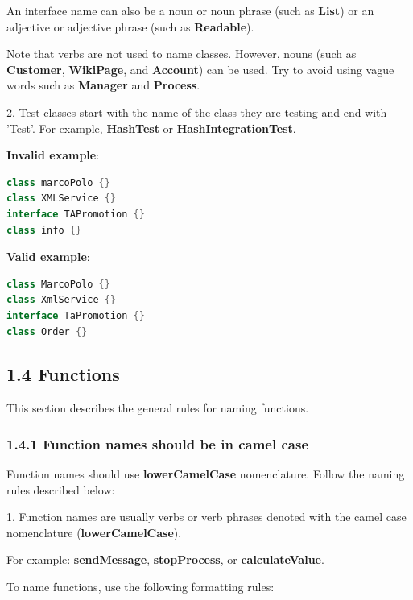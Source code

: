 {{{{{{{{An interface name can also be a noun or noun phrase (such as \textbf{List}) or an adjective or adjective phrase (such as \textbf{Readable}).

Note that verbs are not used to name classes. However, nouns (such as \textbf{Customer}, \textbf{WikiPage}, and \textbf{Account}) can be used. Try to avoid using vague words such as \textbf{Manager} and \textbf{Process}.



2.	Test classes start with the name of the class they are testing and end with 'Test'. For example, \textbf{HashTest} or \textbf{HashIntegrationTest}.



\textbf{Invalid example}: 

\begin{lstlisting}[language=Kotlin]
class marcoPolo {} 
class XMLService {} 
interface TAPromotion {}
class info {}
\end{lstlisting}


\textbf{Valid example}: 

\begin{lstlisting}[language=Kotlin]
class MarcoPolo {}
class XmlService {}
interface TaPromotion {}
class Order {}
\end{lstlisting}


\subsection*{\textbf{1.4 Functions}}

\label{sec:1.4}

This section describes the general rules for naming functions.

\subsubsection*{\textbf{1.4.1 Function names should be in camel case}}
\leavevmode\newline

\label{sec:1.4.1}

Function names should use \textbf{lowerCamelCase} nomenclature. Follow the naming rules described below:

1.	Function names are usually verbs or verb phrases denoted with the camel case nomenclature (\textbf{lowerCamelCase}).

For example: \textbf{sendMessage}, \textbf{stopProcess}, or \textbf{calculateValue}.

To name functions, use the following formatting rules:



}}}}}}}}
